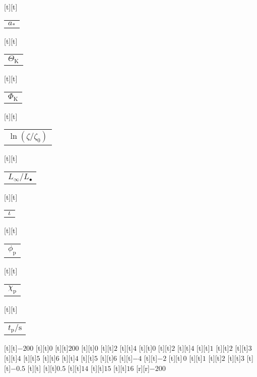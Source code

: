 \begin{psfrags}
[t][t]{\color[rgb]{0,0,0}\setlength{\tabcolsep}{0pt}\begin{tabular}{c}{$a_\ast$}\end{tabular}}%
[t][t]{\color[rgb]{0,0,0}\setlength{\tabcolsep}{0pt}\begin{tabular}{c}{$\Theta_\mathrm{K}$}\end{tabular}}%
[t][t]{\color[rgb]{0,0,0}\setlength{\tabcolsep}{0pt}\begin{tabular}{c}{$\Phi_\mathrm{K}$}\end{tabular}}%
[t][t]{\color[rgb]{0,0,0}\setlength{\tabcolsep}{0pt}\begin{tabular}{c}{$\ln(\zeta/\zeta_0)$}\end{tabular}}%
[t][t]{\color[rgb]{0,0,0}\setlength{\tabcolsep}{0pt}\begin{tabular}{c}{$L_\infty/L_\bullet$}\end{tabular}}%
[t][t]{\color[rgb]{0,0,0}\setlength{\tabcolsep}{0pt}\begin{tabular}{c}{$\iota$}\end{tabular}}%
[t][t]{\color[rgb]{0,0,0}\setlength{\tabcolsep}{0pt}\begin{tabular}{c}{$\phi_\mathrm{p}$}\end{tabular}}%
[t][t]{\color[rgb]{0,0,0}\setlength{\tabcolsep}{0pt}\begin{tabular}{c}{$\chi_\mathrm{p}$}\end{tabular}}%
[t][t]{\color[rgb]{0,0,0}\setlength{\tabcolsep}{0pt}\begin{tabular}{c}{$t_\mathrm{p}/\mathrm{s}$}\end{tabular}}%
%
[t][t]{$-200$}%
[t][t]{$0$}%
[t][t]{$200$}%
[t][t]{$0$}%
[t][t]{$2$}%
[t][t]{$4$}%
[t][t]{$0$}%
[t][t]{$2$}%
[t][t]{$4$}%
[t][t]{$1$}%
[t][t]{$2$}%
[t][t]{$3$}%
[t][t]{$4$}%
[t][t]{$5$}%
[t][t]{$6$}%
[t][t]{$4$}%
[t][t]{$5$}%
[t][t]{$6$}%
[t][t]{$-4$}%
[t][t]{$-2$}%
[t][t]{$\,0$}%
[t][t]{$1$}%
[t][t]{$2$}%
[t][t]{$3$}%
[t][t]{$-0.5$}%
[t][t]{}%
[t][t]{$0.5$}%
[t][t]{$14$}%
[t][t]{$15$}%
[t][t]{$16$}%
%
[r][r]{$-200$}%

\end{psfrags}
